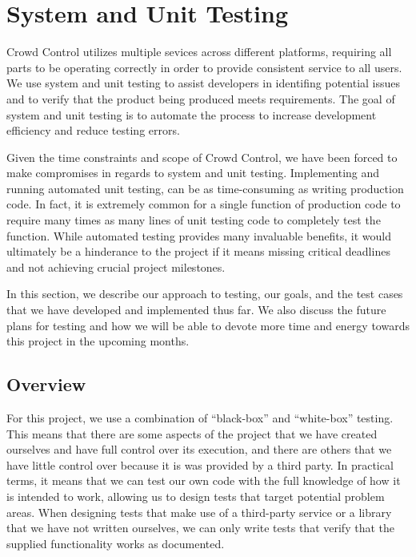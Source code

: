 \renewcommand{\arraystretch}{1.5}

\chapter{System and Unit Testing}

Crowd Control utilizes multiple sevices across different platforms, requiring
all parts to be operating correctly in order to provide consistent service to
all users. We use system and unit testing to assist developers in identifing 
potential issues and to verify that the product being produced meets
requirements. The goal of system and unit testing is to automate the process to
increase development efficiency and reduce testing errors.

Given the time constraints and scope of Crowd Control, we have been forced to
make compromises in regards to system and unit testing. Implementing and running
automated unit testing, can be as time-consuming as writing production code. In
fact, it is extremely common for a single function of production code to require
many times as many lines of unit testing code to completely test the function.
While automated testing provides many invaluable benefits, it would ultimately be
a hinderance to the project if it means missing critical deadlines and not
achieving crucial project milestones.

In this section, we describe our approach to testing, our goals, and the test
cases that we have developed and implemented thus far. We also discuss the
future plans for testing and how we will be able to devote more time and energy
towards this project in the upcoming months.


\section{Overview}

For this project, we use a combination of ``black-box'' and ``white-box''
testing. This means that there are some aspects of the project that we have
created ourselves and have full control over its execution, and there are others
that we have little control over because it is was provided by a third party.
In practical terms, it means that we can test our own code with the full
knowledge of how it is intended to work, allowing us to design tests that target
potential problem areas. When designing tests that make use of a third-party
service or a library that we have not written ourselves, we can only write tests
that verify that the supplied functionality works as documented.

